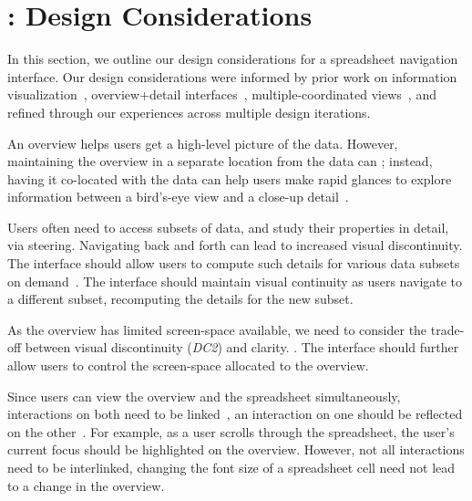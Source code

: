 \section{\noah: Design Considerations}
\label{sec:design}
In this section,
we outline our design considerations
for a spreadsheet navigation interface.
Our design considerations were
informed by prior work on
information visualization~\cite{shneiderman2003eyes,brehmer2013multi}, overview+detail interfaces~\cite{cockburn2009review}, multiple-coordinated views~\cite{wang2000guidelines},
and refined through our experiences
across multiple design iterations.

An overview helps users get a high-level picture
of the data.
However, maintaining the overview in a separate
location from the data can ;
instead, having it co-located with the data
can help users make rapid glances to
explore information between a
bird's-eye view
and a close-up detail~\cite{grudin2001partitioning}.

Users often need to access subsets of data,
and study their properties in detail, \eg via steering.
Navigating back and forth 
can lead to increased visual discontinuity.
The interface should allow users to compute such details for
various data subsets on demand~\cite{shneiderman2003eyes}.
The interface should maintain visual continuity
as users navigate to a different subset,
recomputing the details for the new subset.

As the overview
has limited screen-space available,
we need to consider the trade-off between visual discontinuity (\emph{DC2}) and clarity.
.
The interface should further allow users to control the screen-space allocated
to the overview.


Since users can view the overview
and the spreadsheet simultaneously,
interactions on both need to be linked~\cite{roberts2007state},
\ie an interaction on one should be reflected on
the other~\cite{wang2000guidelines}.
For example, as a user scrolls through
the spreadsheet, the user's current focus
should be highlighted on the overview.
However, not all interactions need to be interlinked,
\eg changing the font size of a spreadsheet cell
need not lead to a change in the overview.



